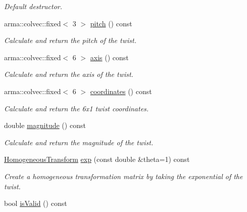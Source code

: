 \begin{DoxyCompactItemize}
\begin{DoxyCompactList}\small\item\em Default destructor. \end{DoxyCompactList}\item 
arma\+::colvec\+::fixed$<$ 3 $>$ \hyperlink{class_twist_a6eda20aad94ab2817a24e8900466ca1c}{pitch} () const 
\begin{DoxyCompactList}\small\item\em Calculate and return the pitch of the twist. \end{DoxyCompactList}\item 
arma\+::colvec\+::fixed$<$ 6 $>$ \hyperlink{class_twist_aa13c6bffb6aad012280a4de936f911c9}{axis} () const 
\begin{DoxyCompactList}\small\item\em Calculate and return the axis of the twist. \end{DoxyCompactList}\item 
arma\+::colvec\+::fixed$<$ 6 $>$ \hyperlink{class_twist_ab5b35a98ac132fb136de5ad7c9029a55}{coordinates} () const 
\begin{DoxyCompactList}\small\item\em Calculate and return the 6x1 twist coordinates. \end{DoxyCompactList}\item 
\hypertarget{class_twist_a11c86066c91649ad9469abe74c462cb5}{double \hyperlink{class_twist_a11c86066c91649ad9469abe74c462cb5}{magnitude} () const }\label{class_twist_a11c86066c91649ad9469abe74c462cb5}

\begin{DoxyCompactList}\small\item\em Calculate and return the magnitude of the twist. \end{DoxyCompactList}\item 
\hyperlink{class_homogeneous_transform}{Homogeneous\+Transform} \hyperlink{class_twist_a7b48ecc2c97d3ab5b162d5b67915abaf}{exp} (const double \&theta=1) const 
\begin{DoxyCompactList}\small\item\em Create a homogeneous transformation matrix by taking the exponential of the twist. \end{DoxyCompactList}\item 
\hypertarget{class_twist_a6c8976333142b347744f4a034b6f96bf}{bool \hyperlink{class_twist_a6c8976333142b347744f4a034b6f96bf}{is\+Valid} () const }\label{class_twist_a6c8976333142b347744f4a034b6f96bf}


\end{DoxyCompactItemize}
